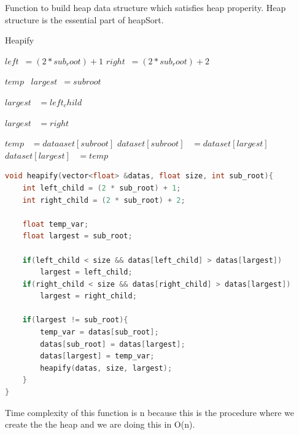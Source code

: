 \documentclass[a4paper, 12pt, titlepage]{article}
\begin{document}
    Function to build heap data structure which satisfies heap properity. Heap structure is the essential part of heapSort.
\begin{algorithm}[H]
	\caption{Heapify}
	\label{algo:dfs}
	\begin{algorithmic}


            \State $left$\ {$ = (2 * sub_root) + 1$}
            \State $right$\ {$ = (2 * sub_root) + 2$}

            

            \State $temp$\ {} 
            \State $largest$\ {$ = subroot$}

                    \State $ largest$  \ {$ = left_child$} 
            \EndIf

                    \State $ largest$  \ {$ = right$} 
            \EndIf

                    \State $ temp$  \ {$ = dataaset[subroot]$}
                    \State $ dataset[subroot]$  \ {$ = dataset[largest]$}
                    \State $ dataset[largest]$  \ {$ = temp$}
                    \State{}
            \EndIf
              

	\EndFunction
	\end{algorithmic}
\end{algorithm}
    
\usepackage{\textbf{Code for Heapify}}
\begin{lstlisting}[language=C++]
void heapify(vector<float> &datas, float size, int sub_root){       
    int left_child = (2 * sub_root) + 1;                           
    int right_child = (2 * sub_root) + 2;                           

    float temp_var;
    float largest = sub_root;

    if(left_child < size && datas[left_child] > datas[largest])      
        largest = left_child;
    if(right_child < size && datas[right_child] > datas[largest])  
        largest = right_child;
    
    if(largest != sub_root){
        temp_var = datas[sub_root];                         
        datas[sub_root] = datas[largest];                   
        datas[largest] = temp_var;
        heapify(datas, size, largest);                      
    }
}
\end{lstlisting}
Time complexity of this function is n because this is the procedure where we create the the heap and we are doing this in O(n).
\end{document}

